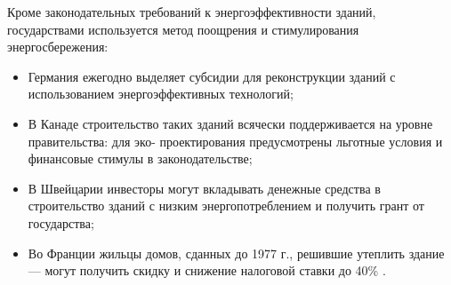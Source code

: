 Кроме законодательных требований к энергоэффективности зданий, государствами используется метод поощрения и стимулирования энергосбережения:
\begin{itemize}
    \item Германия ежегодно выделяет субсидии для реконструкции зданий с использованием энергоэффективных технологий;
    \item В Канаде строительство таких зданий всячески поддерживается на уровне правительства: для эко- проектирования предусмотрены льготные условия и финансовые стимулы в законодательстве;
    \item В Швейцарии инвесторы могут вкладывать денежные средства в строительство зданий с низким энергопотреблением и получить грант от государства;
    \item Во Франции жильцы домов, сданных до 1977 г., решившие утеплить здание --- могут получить скидку и снижение налоговой ставки до 40\% \cite{2016buee_Sheyna_AltenergyWorldtrands}.
\end{itemize}






% 












